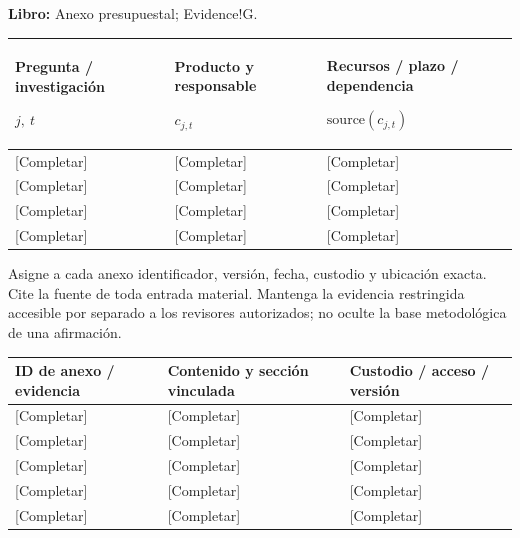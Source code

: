 \textbf{Libro:} Anexo presupuestal; Evidence!G.\par\endgroup
{\sffamily\fontsize{8.3}{10.3}\selectfont\begin{longtable}{@{}P{57.74mm} P{57.74mm} P{49.49mm}@{}}
\toprule
\textbf{Pregunta / investigación}\par {\normalfont\fontsize{8.2}{10}\selectfont $j,\ t$} & \textbf{Producto y responsable}\par {\normalfont\fontsize{8.2}{10}\selectfont $c_{j,t}$} & \textbf{Recursos / plazo / dependencia}\par {\normalfont\fontsize{8.2}{10}\selectfont $\text{source}(c_{j,t})$}\\\midrule\endhead
\rule{0pt}{7.7mm}[Completar] & [Completar] & [Completar]\\\hline
\rule{0pt}{7.7mm}[Completar] & [Completar] & [Completar]\\\hline
\rule{0pt}{7.7mm}[Completar] & [Completar] & [Completar]\\\hline
\rule{0pt}{7.7mm}[Completar] & [Completar] & [Completar]\\\hline
\end{longtable}}
\begin{Notice}Asigne a cada anexo identificador, versión, fecha, custodio y ubicación exacta. Cite la fuente de toda entrada material. Mantenga la evidencia restringida accesible por separado a los revisores autorizados; no oculte la base metodológica de una afirmación.\end{Notice}
{\sffamily\fontsize{8.3}{10.3}\selectfont\begin{longtable}{@{}P{39.59mm} P{75.89mm} P{49.49mm}@{}}
\toprule
\textbf{ID de anexo / evidencia} & \textbf{Contenido y sección vinculada} & \textbf{Custodio / acceso / versión}\\\midrule\endhead
\rule{0pt}{7.7mm}[Completar] & [Completar] & [Completar]\\\hline
\rule{0pt}{7.7mm}[Completar] & [Completar] & [Completar]\\\hline
\rule{0pt}{7.7mm}[Completar] & [Completar] & [Completar]\\\hline
\rule{0pt}{7.7mm}[Completar] & [Completar] & [Completar]\\\hline
\rule{0pt}{7.7mm}[Completar] & [Completar] & [Completar]\\\hline
\end{longtable}}
